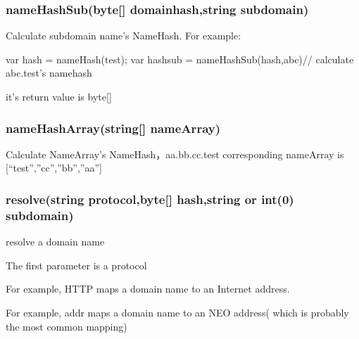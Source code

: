 \documentclass[letterpaper,10pt,english]{sphinxmanual}
\begin{document}
\subsubsection{nameHashSub(byte{[}{]} domainhash,string subdomain)}
\label{\detokenize{nns_protocol:namehashsub-byte-domainhash-string-subdomain}}
Calculate subdomain name’s NameHash. For example:

%
\begin{sphinxVerbatim}[commandchars=\\\{\}]
var hash = nameHash(\PYGZdq{}test\PYGZdq{});
var hashsub = nameHashSub(hash,\PYGZdq{}abc\PYGZdq{})// calculate abc.test’s namehash
\end{sphinxVerbatim}

it’s return value is byte{[}{]}


\subsubsection{nameHashArray(string{[}{]} nameArray)}
\label{\detokenize{nns_protocol:namehasharray-string-namearray}}
Calculate NameArray’s NameHash，aa.bb.cc.test corresponding nameArray is {[}“test”,”cc”,”bb”,”aa”{]}

%
\begin{sphinxVerbatim}[commandchars=\\\{\}]
   \PYG{p}{[}\PYG{p}{]}
\end{sphinxVerbatim}


\subsubsection{resolve(string protocol,byte{[}{]} hash,string or int(0) subdomain)}
\label{\detokenize{nns_protocol:resolve-string-protocol-byte-hash-string-or-int-0-subdomain}}
resolve a domain name

The first parameter is a protocol

For example, HTTP maps a domain name to an Internet address.

For example, addr maps a domain name to an NEO address( which is probably the most common mapping)
\end{document}
